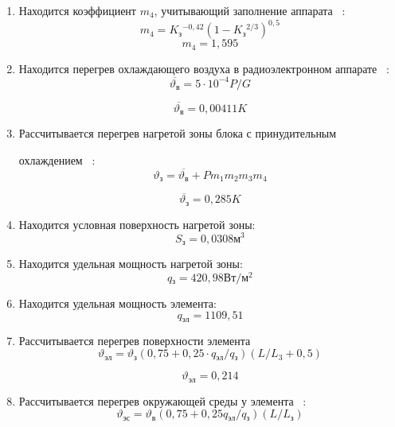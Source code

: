 \begin{enumerate}[label={\arabic*.}]
\item Находится коэффициент $m_4$,
   учитывающий заполнение аппарата ~\cite{Rotkop1976}:
   \begin{equation}
     m_4 = K\mathrm{_{з}}^{-0,42}(1-K\mathrm{_{з}}^{2/3})^{0,5}
   \end{equation}
   $$m_4 = 1,595$$
  
\item Находится перегрев охлаждающего воздуха
  в радиоэлектронном аппарате ~\cite{Rotkop1976}:
  \begin{equation}
    \overline{\vartheta\mathrm{_{в}}} = 5 \cdot 10^{-4} P/G
  \end{equation}
  
  $$\overline{\vartheta\mathrm{_{в}}} = 0,00411K$$

\item Рассчитывается перегрев нагретой зоны блока с принудительным

  охлаждением ~\cite{Rotkop1976}:
  \begin{equation}
    \vartheta\mathrm{_{з}} = \overline{\vartheta\mathrm{_{в}}} + P m_1 m_2 m_3 m_4
    \end{equation}
  

    $$\overline{\vartheta\mathrm{_{з}}} = 0,285 K$$

\item Находится условная поверхность нагретой зоны:
  $$S\mathrm{_{з}} = 0,0308 \mathrm{м^3}$$

\item Находится удельная мощность нагретой зоны:
  $$q\mathrm{_{з}} = 420,98 \mathrm{Вт/м^2}$$

\item Находится удельная мощность элемента:
  $$q\mathrm{_{эл}} = 1109,51$$

\item Рассчитывается перегрев поверхности элемента ~\cite{Rotkop1976}
    \begin{equation}
    \vartheta\mathrm{_{эл}}   =  \vartheta\mathrm{_{з}} (0,75 + 0,25 \cdot q\mathrm{_{эл}} / q\mathrm{_{з}})(L /L_{3} + 0,5)
    \end{equation}

    $$\vartheta\mathrm{_{эл}} = 0,214$$

\item Рассчитывается перегрев окружающей
  среды у элемента ~\cite{Rotkop1976}:
  \begin{equation}
    \vartheta\mathrm{_{эс}} = \vartheta\mathrm{_{в}} (0,75 + 0,25 q\mathrm{_{эл}} / q\mathrm{_{з}}) ({L} / {L_{з}})
  \end{equation}
  

\end{enumerate}
